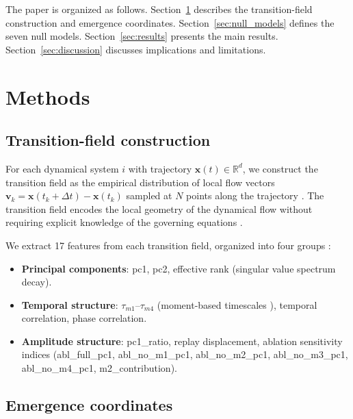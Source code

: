 \documentclass[aip,chaos,showpacs,superscriptaddress,groupedaddress]{revtex4-1}
\begin{document}
The paper is organized as follows. Section~\ref{sec:methods} describes the transition-field construction and emergence coordinates. Section~\ref{sec:null_models} defines the seven null models. Section~\ref{sec:results} presents the main results. Section~\ref{sec:discussion} discusses implications and limitations.

\section{Methods}
\label{sec:methods}

\subsection{Transition-field construction}
\label{sec:field_construction}

For each dynamical system $i$ with trajectory $\mathbf{x}(t) \in \mathbb{R}^d$, we construct the transition field as the empirical distribution of local flow vectors $\mathbf{v}_k = \mathbf{x}(t_k + \Delta t) - \mathbf{x}(t_k)$ sampled at $N$ points along the trajectory \cite{packard1980geometry, fraser1986independent}. The transition field encodes the local geometry of the dynamical flow without requiring explicit knowledge of the governing equations \cite{takens1981detecting}.

We extract 17 features from each transition field, organized into four groups \cite{broomhead1986extracting}:
\begin{itemize}
\item \textbf{Principal components}: pc1, pc2, effective rank \cite{roy1989effective, yang2018effective, demers2005effective} (singular value spectrum decay).
\item \textbf{Temporal structure}: $\tau_{m1}$--$\tau_{m4}$ (moment-based timescales \cite{kantz1997nonlinear}), temporal correlation, phase correlation.
\item \textbf{Amplitude structure}: pc1\_ratio, replay displacement, ablation sensitivity indices (abl\_full\_pc1, abl\_no\_m1\_pc1, abl\_no\_m2\_pc1, abl\_no\_m3\_pc1, abl\_no\_m4\_pc1, m2\_contribution).
\end{itemize}

\subsection{Emergence coordinates}
\label{sec:emergence_coords}
\end{document}
